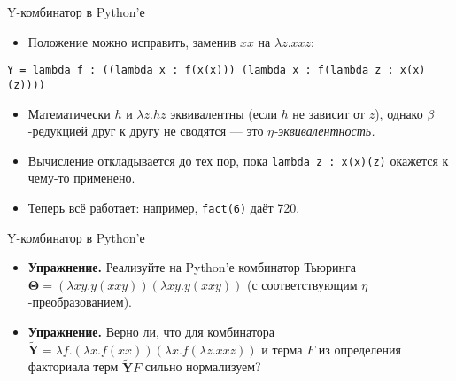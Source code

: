 \documentclass[xcolor=dvipsnames]{beamer}
\newcommand{\Yx}{\mathbf{Y}}
\begin{document}
\begin{frame}[fragile]{Y-комбинатор в Python'е}
 
 \begin{itemize}
  \item Положение можно исправить, заменив $xx$ на $\lambda z . xxz$:
  \end{itemize}
  \vspace*{-1.5em}
  {\footnotesize
  \hspace*{-2em}
\begin{verbatim}
Y = lambda f : ((lambda x : f(x(x))) (lambda x : f(lambda z : x(x)(z))))   
 \end{verbatim}
}
 
 
 \begin{itemize}
  \item<2-> Математически $h$ и $\lambda z. hz$ эквивалентны (если $h$ не зависит от $z$), однако $\beta$-редукцией друг к другу не сводятся --- это {\em $\eta$-эквивалентность.}
  \item<3-> Вычисление откладывается до тех пор, пока \texttt{lambda z : x(x)(z)} окажется к чему-то применено.
  \item<4-> Теперь всё работает: например, \texttt{fact(6)} даёт 720.
 \end{itemize}


 
\end{frame}

\begin{frame}{Y-комбинатор в Python'е}

\begin{itemize}[<+->]
 \item {\bf Упражнение.} Реализуйте на Python'е комбинатор Тьюринга $\boldsymbol{\Theta} = 
  (\lambda xy. y(xxy)) (\lambda xy. y(xxy))$ (с соответствующим $\eta$-преобразованием).
 \item {\bf Упражнение.} Верно ли, что для комбинатора $\widetilde{\Yx} = \lambda f. (\lambda x. f(xx)) (\lambda x. f(\lambda z. xxz))$ и терма $F$ из определения факториала терм $\widetilde{\Yx} F$ сильно нормализуем?
\end{itemize}

 
\end{frame}
\end{document}
